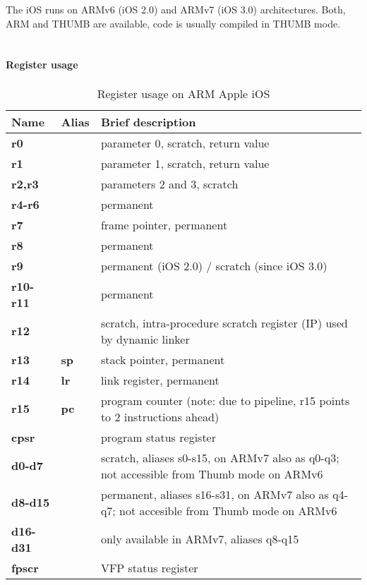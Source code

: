 The iOS runs on ARMv6 (iOS 2.0) and ARMv7 (iOS 3.0) architectures. Both, ARM and THUMB are available,
code is usually compiled in THUMB mode.\\
\\
\paragraph{Register usage}

\begin{table}[h]
\begin{tabular*}{0.95\textwidth}{lll}
Name         & Alias    & Brief description\\
\hline
{\bf r0}     &          & parameter 0, scratch, return value\\
{\bf r1}     &          & parameter 1, scratch, return value\\
{\bf r2,r3}  &          & parameters 2 and 3, scratch\\
{\bf r4-r6}  &          & permanent\\
{\bf r7}     &          & frame pointer, permanent\\
{\bf r8}     &          & permanent\\
{\bf r9}     &          & permanent (iOS 2.0) / scratch (since iOS 3.0)\\
{\bf r10-r11}&          & permanent\\
{\bf r12}    &          & scratch, intra-procedure scratch register (IP) used by dynamic linker\\
{\bf r13}    & {\bf sp} & stack pointer, permanent\\
{\bf r14}    & {\bf lr} & link register, permanent\\
{\bf r15}    & {\bf pc} & program counter (note: due to pipeline, r15 points to 2 instructions ahead)\\
{\bf cpsr}   &          & program status register\\
{\bf d0-d7}  &          & scratch, aliases s0-s15, on ARMv7 also as q0-q3; not accessible from Thumb mode on ARMv6\\
{\bf d8-d15} &          & permanent, aliases s16-s31, on ARMv7 also as q4-q7; not accesible from Thumb mode on ARMv6\\
{\bf d16-d31}&          & only available in ARMv7, aliases q8-q15\\
{\bf fpscr}  &          & VFP status register\\
\end{tabular*}
\caption{Register usage on ARM Apple iOS}
\end{table}

